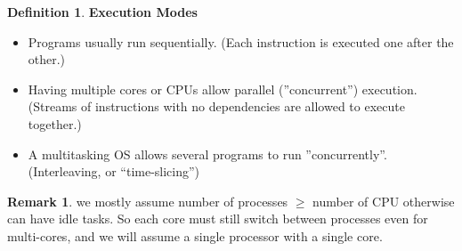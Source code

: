 \documentclass[12pt,a4paper]{article}
\theoremstyle{definition}
\newtheorem*{remark}{Remark}
\newtheorem{definition}{Definition}[section]
\newenvironment{myitemize}
{ \begin{itemize}
    \setlength{\itemsep}{5pt}
    \setlength{\parskip}{0pt}
    \setlength{\parsep}{0pt}     }
{ \end{itemize}                  }
\begin{document}
\begin{definition}{\textbf{Execution Modes}}
	\begin{myitemize}
		\item Programs usually run sequentially. (Each instruction is executed one after the other.)
		\item Having multiple cores or CPUs allow parallel (''concurrent'') execution. (Streams of instructions with no dependencies are allowed to execute together.)
		\item A multitasking OS allows several programs to run ''concurrently''. (Interleaving, or “time-slicing”)
	\end{myitemize}
\end{definition}

\begin{remark}
	we mostly assume number of processes $\geq$ number of CPU otherwise can have idle tasks. So each core must still switch between processes even for multi-cores, and we will assume a single processor with a single core.
\end{remark}
\end{document}
